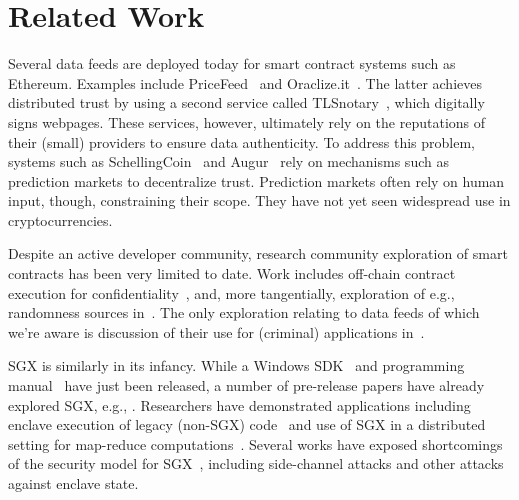 \section{Related Work}
\label{sec:related}

Several data feeds are deployed today for smart contract systems such as Ethereum. Examples include PriceFeed~\cite{PriceFeed:2016} and Oraclize.it~\cite{Oraclize:2016}. The latter achieves distributed trust by using a second service called TLSnotary~\cite{TLSnotary}, which digitally signs webpages. These services, however, ultimately rely on the reputations of their (small) providers to ensure data authenticity.  To address this problem, systems such as SchellingCoin~\cite{schellingcoin} and Augur~\cite{augur} rely on mechanisms such as prediction markets to decentralize trust. Prediction markets often rely on human input, though, constraining their scope. They have not yet seen widespread use in cryptocurrencies. 

Despite an active developer community, research community exploration of smart contracts has been very limited to date. Work includes off-chain contract execution for confidentiality~\cite{hawk}, and, more tangentially, exploration of e.g., randomness sources in~\cite{bonneau2015bitcoin}. The only exploration relating to data feeds of which we're aware is discussion of their use for (criminal) applications in~\cite{gyges}.

SGX is similarly in its infancy.
While a Windows SDK~\cite{sgxsdk} and programming manual~\cite{sgxmanual} have just been released, a number of pre-release papers have already explored SGX, e.g., \cite{VC3,7163052,anati2013innovative,McKeen:2013jv,Phegade:2013km}. Researchers have demonstrated applications including enclave execution of legacy (non-SGX) code~\cite{haven} and use of SGX in a distributed setting for map-reduce computations~\cite{VC3}. Several works have exposed shortcomings of the security model for SGX~\cite{sgxexplained,sgxsok,shihardwaretalk}, including side-channel attacks and other attacks against enclave state. 


